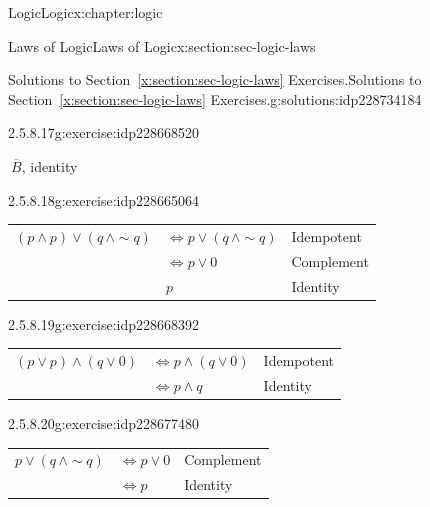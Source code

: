 \documentclass[twoside,10pt,]{book}
\newcommand{\tabularfont}{\relax}
\newcommand{\xreffont}{\relax}
\numberwithin{equation}{section}
\begin{document}
\begin{chapterptx}{Logic}{}{Logic}{}{}{x:chapter:logic}
\begin{sectionptx}{Laws of Logic}{}{Laws of Logic}{}{}{x:section:sec-logic-laws}
\begin{solutions-subsection}{Solutions to Section~{\xreffont\ref*{x:section:sec-logic-laws}} Exercises.}{}{Solutions to Section~{\xreffont\ref*{x:section:sec-logic-laws}} Exercises.}{}{}{g:solutions:idp228734184}
\begin{exercisegroup}
\begin{divisionsolutioneg}{2.5.8.17}{}{g:exercise:idp228668520}%
\par\smallskip%
\noindent\hypertarget{g:solution:idp228663912-main}{}\(\ \overline{B}\), identity\end{divisionsolutioneg}%
\end{exercisegroup}
\par\medskip\noindent
\begin{exercisegroup}
\begin{divisionsolutioneg}{2.5.8.18}{}{g:exercise:idp228665064}%
\par\smallskip%
\noindent\hypertarget{g:solution:idp228666472-main}{}\begin{center}%
{\tabularfont%
\begin{tabular}{lll}
\multicolumn{1}{c}{\((p{\wedge} p){\vee}(q\,{\wedge}\sim\!{q})\)}&\(\Leftrightarrow p{\vee}(q\,{\wedge}\sim\!{q})\)&Idempotent\tabularnewline[0pt]
&\(\Leftrightarrow p{\vee} 0\)&Complement\tabularnewline[0pt]
&\(p\)&Identity
\end{tabular}
}%
\end{center}%
\end{divisionsolutioneg}%
\begin{divisionsolutioneg}{2.5.8.19}{}{g:exercise:idp228668392}%
\par\smallskip%
\noindent\hypertarget{g:solution:idp228669288-main}{}\begin{center}%
{\tabularfont%
\begin{tabular}{lll}
\multicolumn{1}{c}{\((p{\vee} p){\wedge}(q{\vee} 0)\)}&\(\Leftrightarrow p{\wedge}(q{\vee} 0)\)&Idempotent\tabularnewline[0pt]
&\(\Leftrightarrow p{\wedge} q\)&Identity
\end{tabular}
}%
\end{center}%
\end{divisionsolutioneg}%
\begin{divisionsolutioneg}{2.5.8.20}{}{g:exercise:idp228677480}%
\par\smallskip%
\noindent\hypertarget{g:solution:idp228672360-main}{}\begin{center}%
{\tabularfont%
\begin{tabular}{lll}
\multicolumn{1}{c}{\(p{\vee}(q\,{\wedge}\sim\!{q})\)}&\(\Leftrightarrow p{\vee} 0\)&Complement\tabularnewline[0pt]
&\(\Leftrightarrow p\)&Identity
\end{tabular}
}%
\end{center}%
\end{divisionsolutioneg}%

\end{exercisegroup}
\end{solutions-subsection}
\end{sectionptx}
\end{chapterptx}
\end{document}
